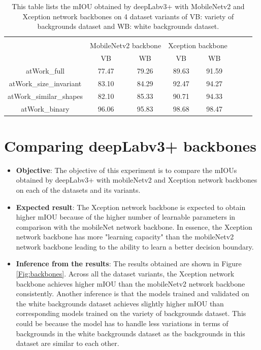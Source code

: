 	\begin{table}
	\centering
	\begin{tabular}{|c|c|c|c|c|c|c|c|}
	\hline 
	\multicolumn{ 1}{|l|}{\makecell{\textbf{Dataset variant}}} & \multicolumn{ 4}{l|}{\makecell{\textbf{mIOU in \%}}} \\ \cline{ 2- 5}
	\multicolumn{ 1}{|l|}{} & \multicolumn{ 2}{l|}{MobileNetv2 backbone} & \multicolumn{ 2}{l|}{Xception backbone} \\ \cline{ 2- 5}
	\multicolumn{ 1}{|l|}{} & VB & WB & VB & WB \\ \hline 
	atWork\_full & 77.47 & 79.26 & 89.63 & 91.59 \\ 
	\hline 
	atWork\_size\_invariant & 83.10 & 84.29 & 92.47 & 94.27 \\ 
	\hline 
	atWork\_similar\_shapes & 82.10 & 85.33 & 90.71 & 94.33 \\ 
	\hline 
	atWork\_binary & 96.06 & 95.83 & 98.68 & 98.47 \\ 
	\hline 
	\end{tabular}
	\caption{This table lists the mIOU obtained by deepLabv3+ with MobileNetv2 and Xception network backbones on 4 dataset variants of VB: variety of backgrounds dataset and WB: white backgrounds dataset.} 
	\label{Table:vars}
\end{table}

\section{Comparing deepLabv3+ backbones}

	\begin{itemize}
		\item \textbf{Objective}: The objective of this experiment is to compare the mIOUs obtained by deepLabv3+ with mobileNetv2 and Xception network backbones on each of the datasets and its variants.
		\item \textbf{Expected result}: The Xception network backbone is expected to obtain higher mIOU because of the higher number of learnable parameters in comparison with the mobileNet network backbone. In essence, the Xception network backbone has more "learning capacity" than the mobileNetv2 network backbone leading to the ability to learn a better decision boundary.
		\item \textbf{Inference from the results}: The results obtained are shown in Figure \ref{Fig:backbones}. Across all the dataset variants, the Xception network backbone achieves higher mIOU than the mobileNetv2 network backbone consistently. Another inference is that the models trained and validated on the white backgrounds dataset achieves slightly higher mIOU than corresponding models trained on the variety of backgrounds dataset. This could be because the model has to handle less variations in terms of backgrounds in the white backgrounds dataset as the backgrounds in this dataset are similar to each other.
	\end{itemize}

